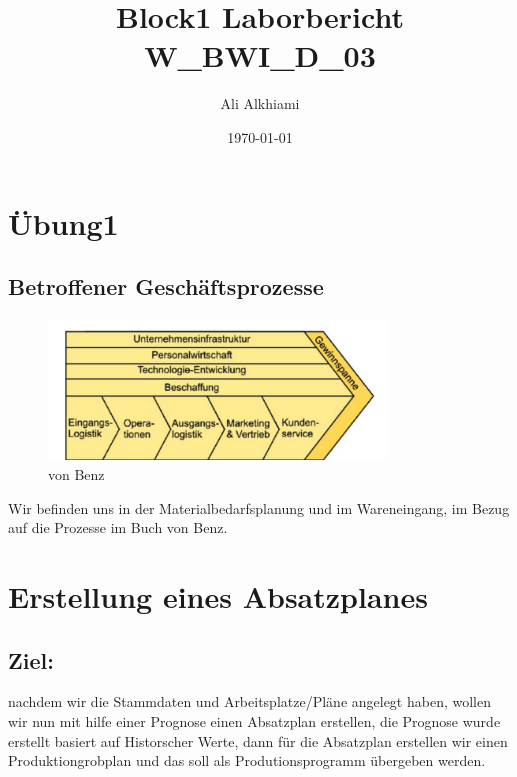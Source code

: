 \documentclass{article}
\begin{document}
\title{Block1 Laborbericht W\_BWI\_D\_03}
\author{Ali Alkhiami}
\date{\today}
\maketitle
\tableofcontents
\newpage



\section{Übung1}
\subsection{Betroffener Geschäftsprozesse}
\begin{figure}[H]
\vspace{-10pt}
  \centering
  \includegraphics[width=0.8\textwidth]{land.png}
  \caption{von Benz }
  \label{fig:image}
\end{figure}



Wir befinden uns in der Materialbedarfsplanung und im Wareneingang, im Bezug auf die Prozesse im Buch von Benz.


\section{Erstellung eines Absatzplanes}
\subsection{Ziel: }
 nachdem wir  die Stammdaten und Arbeitsplatze/Pläne angelegt haben, wollen wir nun mit hilfe einer Prognose einen Absatzplan erstellen, die Prognose wurde erstellt basiert auf Historscher Werte, dann für die Absatzplan erstellen wir einen Produktiongrobplan und das soll als Produtionsprogramm übergeben werden.
 
\end{document}
